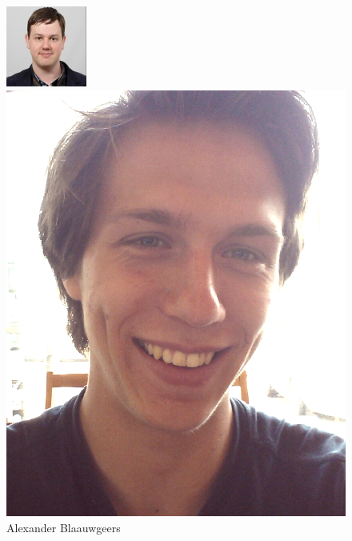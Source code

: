 \documentclass[11pt]{article}
\begin{document}
\begin{figure}[htbp]
  \begin{minipage}[b]{0.25\linewidth}
    \centering
    \includegraphics[width=1.5\linewidth]{blaauwgeersba.jpg}
    \caption{Alexander Blaauwgeers}
  \end{minipage}
  \hspace{6.0cm}
  \begin{minipage}[b]{0.25\linewidth}
    \centering
    \includegraphics[width=1.2\linewidth]{vin.png}

\end{minipage}
\end{figure}
\end{document}
